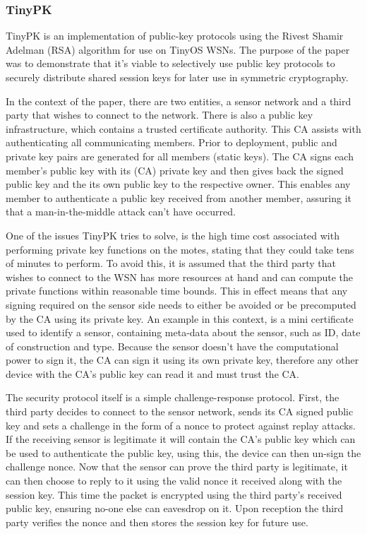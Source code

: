 \documentclass{mprop}
\begin{document}

\subsubsection{TinyPK} %
\label{ssub:tinypk}
TinyPK is an implementation of public-key protocols using the Rivest Shamir Adelman (RSA) algorithm for use on TinyOS WSNs\cite{TinyPK}. The purpose of the paper was to demonstrate that it's viable to selectively use public key protocols to securely distribute shared session keys for later use in symmetric cryptography.

In the context of the paper, there are two entities, a sensor network and a third party that wishes to connect to the network. There is also a public key infrastructure, which contains a trusted certificate authority. This CA assists with authenticating all communicating members. Prior to deployment, public and private key pairs are generated for all members (static keys). The CA signs each member's public key with its (CA) private key and then gives back the signed public key and the its own public key to the respective owner. This enables any member to authenticate a public key received from another member, assuring it that a man-in-the-middle attack can't have occurred.

One of the issues TinyPK tries to solve, is the high time cost associated with performing private key functions on the motes, stating that they could take tens of minutes to perform. To avoid this, it is assumed that the third party that wishes to connect to the WSN has more resources at hand and can compute the private functions within reasonable time bounds. This in effect means that any signing required on the sensor side needs to either be avoided or be precomputed by the CA using its private key. An example in this context, is a mini certificate used to identify a sensor, containing meta-data about the sensor, such as ID, date of construction and type. Because the sensor doesn't have the computational power to sign it, the CA can sign it using its own private key, therefore any other device with the CA's public key can read it and must trust the CA.

The security protocol itself is a simple challenge-response protocol. First, the third party decides to connect to the sensor network, sends its CA signed public key and sets a challenge in the form of a nonce to protect against replay attacks. If the receiving sensor is legitimate it will contain the CA's public key which can be used to authenticate the public key, using this, the device can then un-sign the challenge nonce. Now that the sensor can prove the third party is legitimate, it can then choose to reply to it using the valid nonce it received along with the session key. This time the packet is encrypted using the third party's received public key, ensuring no-one else can eavesdrop on it. Upon reception the third party verifies the nonce and then stores the session key for future use. 
\end{document}
